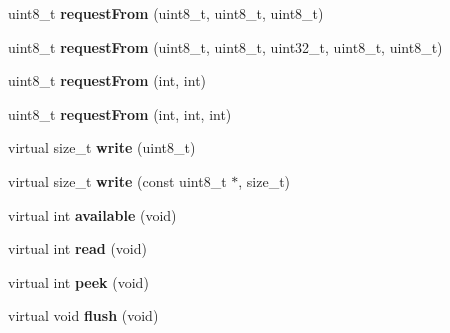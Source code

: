 \begin{DoxyCompactItemize}
\item 
uint8\+\_\+t {\bfseries request\+From} (uint8\+\_\+t, uint8\+\_\+t, uint8\+\_\+t)\hypertarget{class_two_wire_a4b4b618531a04d5488a52583a3dfb173}{}\label{class_two_wire_a4b4b618531a04d5488a52583a3dfb173}

\item 
uint8\+\_\+t {\bfseries request\+From} (uint8\+\_\+t, uint8\+\_\+t, uint32\+\_\+t, uint8\+\_\+t, uint8\+\_\+t)\hypertarget{class_two_wire_acd59cc9570fd49b1cf9044cbefef85ac}{}\label{class_two_wire_acd59cc9570fd49b1cf9044cbefef85ac}

\item 
uint8\+\_\+t {\bfseries request\+From} (int, int)\hypertarget{class_two_wire_ad40a27213d0bb32f7b819aa8962fccd3}{}\label{class_two_wire_ad40a27213d0bb32f7b819aa8962fccd3}

\item 
uint8\+\_\+t {\bfseries request\+From} (int, int, int)\hypertarget{class_two_wire_a3d76da36fb8571e0b5e8310e9f86f6fe}{}\label{class_two_wire_a3d76da36fb8571e0b5e8310e9f86f6fe}

\item 
virtual size\+\_\+t {\bfseries write} (uint8\+\_\+t)\hypertarget{class_two_wire_a318b7bec156c1f1075a818c0ad3427d7}{}\label{class_two_wire_a318b7bec156c1f1075a818c0ad3427d7}

\item 
virtual size\+\_\+t {\bfseries write} (const uint8\+\_\+t $\ast$, size\+\_\+t)\hypertarget{class_two_wire_a1957b4d5a6a997bdde436e9e40d131a7}{}\label{class_two_wire_a1957b4d5a6a997bdde436e9e40d131a7}

\item 
virtual int {\bfseries available} (void)\hypertarget{class_two_wire_aee57bc52bee06508e231c5fc6bc35ada}{}\label{class_two_wire_aee57bc52bee06508e231c5fc6bc35ada}

\item 
virtual int {\bfseries read} (void)\hypertarget{class_two_wire_aa361b83500d00dfb93bb25b6473b33e9}{}\label{class_two_wire_aa361b83500d00dfb93bb25b6473b33e9}

\item 
virtual int {\bfseries peek} (void)\hypertarget{class_two_wire_a5bd64cb7bd609e9470a15d96a0991ec8}{}\label{class_two_wire_a5bd64cb7bd609e9470a15d96a0991ec8}

\item 
virtual void {\bfseries flush} (void)\hypertarget{class_two_wire_a4d92ddf6ca349c815de1de15fca06b5e}{}\label{class_two_wire_a4d92ddf6ca349c815de1de15fca06b5e}


\end{DoxyCompactItemize}
